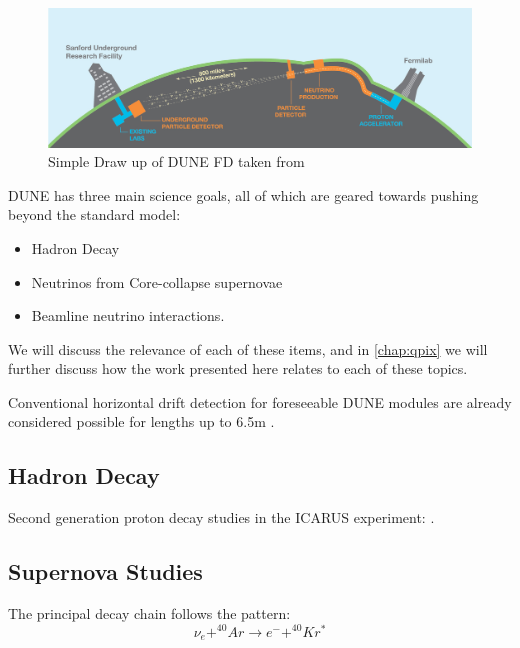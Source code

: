 \begin{figure}[]
\centering
\includegraphics[width=\textwidth]{images/LBNE_Graphic_061615_2016.jpg}
\caption{Simple Draw up of DUNE FD taken from \citep{dune_cdr_2016_arxiv}}
\end{figure}

DUNE has three main science goals, all of which are geared towards pushing beyond the standard model:
\begin{itemize}
    \item Hadron Decay
    \item Neutrinos from Core-collapse supernovae
    \item Beamline neutrino interactions.
\end{itemize}

We will discuss the relevance of each of these items, and in \ref{chap:qpix} we will further discuss how the work presented here relates to each of these topics. 


Conventional horizontal drift detection for foreseeable DUNE modules are already considered possible for lengths up to 6.5m \citep{DUNE_Vertical:Paulucci_2022}.


\subsection{Hadron Decay}
\label{sect:intro_decay}

Second generation proton decay studies in the ICARUS experiment: \citep{ICARUS_2001}.


\subsection{Supernova Studies}
\label{sect:intro_supernova}

The principal decay chain follows the pattern:
\begin{equation}
    \nu_{e} + ^{40}Ar \rightarrow e^- + ^{40}Kr^*
\end{equation}

